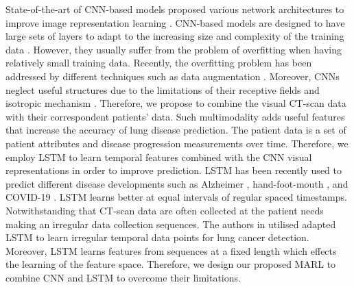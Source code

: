 \documentclass[conference]{IEEEtran}
\begin{document}
State-of-the-art of CNN-based models proposed various network architectures to improve image representation learning \cite{simonyan2014very,he2016deep,huang2016deep,he2016identity,huang2017densely,Sandler_2018_CVPR,howard2017mobilenets,zoph2018learning,chollet2017xception,tan2019efficientnet}. CNN-based models are designed to have large sets of layers to adapt to the increasing size and complexity of the training data \cite{hamdi2021flexgrid2vec}. However, they usually suffer from the problem of overfitting when having relatively small training data. Recently, the overfitting problem has been addressed by different techniques such as data augmentation \cite{masi2016we}. Moreover, CNNs neglect useful structures due to the limitations of their receptive fields and isotropic mechanism \cite{luo2016understanding}. Therefore, we propose to combine the visual CT-scan data with their correspondent patients' data. Such multimodality adds useful features that increase the accuracy of lung disease prediction. The patient data is a set of patient attributes and disease progression measurements over time. Therefore, we employ LSTM to learn temporal features combined with the CNN visual representations in order to improve prediction. LSTM has been recently used to predict different disease developments such as Alzheimer \cite{hong2019predicting}, hand-foot-mouth \cite{gu2019method}, and COVID-19 \cite{chimmula2020time}. LSTM learns better at equal intervals of regular spaced timestamps. Notwithstanding that CT-scan data are often collected at the patient needs making an irregular data collection sequences. The authors in \cite{gao2019distanced} utilised adapted LSTM to learn irregular temporal data points for lung cancer detection. Moreover, LSTM learns features from sequences at a fixed length which effects the learning of the feature space. Therefore, we design our proposed MARL to combine CNN and LSTM to overcome their limitations.
\end{document}
